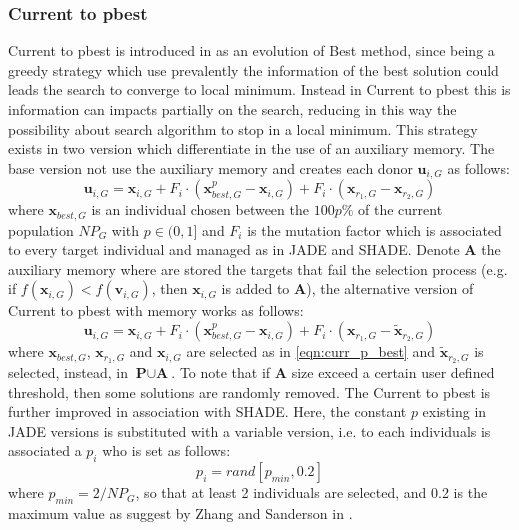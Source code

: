\subsubsection{Current to pbest}\label{subsubsec:curr_p_best}
Current to pbest is introduced in \cite{JADE:2009} as an evolution of Best method, since being a greedy strategy which use prevalently the information of the best solution could leads the search to converge to local minimum. Instead in Current to pbest this is information can impacts partially on the search, reducing in this way the possibility about search algorithm to stop in a local minimum.\newline\newline
This strategy exists in two version which differentiate in the use of an auxiliary memory. The base version not use the auxiliary memory and creates each donor $\textbf{u}_{i, G}$ as follows:
\begin{equation}
	\textbf{u}_{i, G} = \textbf{x}_{i, G} + F_i \cdot (\textbf{x}_{\textit{best}, G}^p - \textbf{x}_{i, G}) + F_i \cdot (\textbf{x}_{r_1, G} - \textbf{x}_{r_2, G})
\end{equation}\label{eqn:curr_p_best}
where $\textbf{x}_{\textit{best}, G}$ is an individual chosen between the $100p\%$ of the current population $\textit{NP}_{G}$ with $p \in (0, 1]$ and $F_i$ is the mutation factor which is associated to every target individual and managed as in JADE and SHADE.\newline\newline
Denote \textbf{A} the auxiliary memory where are stored the targets that fail the selection process (e.g. if $f(\textbf{x}_{i, G}) < f(\textbf{v}_{i, G})$, then $\textbf{x}_{i, G}$ is added to $\textbf{A}$), the alternative version of Current to pbest with memory works as follows:
\begin{equation}
	\textbf{u}_{i, G} = \textbf{x}_{i, G} + F_i \cdot (\textbf{x}_{\textit{best}, G}^{p} - \textbf{x}_{i, G}) + F_i \cdot (\textbf{x}_{r_1, G} - \tilde{\textbf{x}}_{r_2, G})
\end{equation}
where $\textbf{x}_{\textit{best}, G}$, $\textbf{x}_{r_1, G}$ and $\textbf{x}_{i, G}$ are selected as in \ref{eqn:curr_p_best} and $\tilde{\textbf{x}}_{r_2, G}$ is selected, instead, in $\textbf{P} \cup \textbf{A}$. To note that if $\textbf{A}$ size exceed a certain user defined threshold, then some solutions are randomly removed.\newline\newline
The Current to pbest is further improved in association with SHADE. Here, the constant $p$ existing in JADE versions is substituted with a variable version, i.e. to each individuals is associated a $p_i$ who is set as follows:
\begin{equation}
p_i = rand[p_{\textit{min}}, 0.2]
\end{equation}
where $p_{\textit{min}} = 2 / \textit{NP}_G$, so that at least 2 individuals are selected, and 0.2 is the maximum value as suggest by Zhang and Sanderson in \cite{JADE:2009}.
